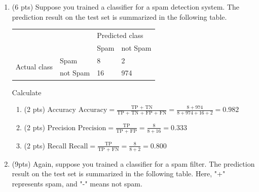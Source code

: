 \documentclass[a4paper]{article}
\theoremstyle{definition}
\newenvironment{soln}{
    \leavevmode\color{blue}\ignorespaces
}{}
\begin{document}
\begin{enumerate}
\begin{enumerate}
	\medskip

\end{enumerate}

\pagebreak

\item (6 pts) Suppose you trained a classifier for a spam detection system. The prediction result on the test set is summarized in the following table.
\begin{center}
	\begin{tabular}{l l | l l}
		&          & \multicolumn{2}{l}{Predicted class} \\
		&          & Spam           & not Spam           \\
		\hline
		\multirow{2}{*}{Actual class} & Spam     & 8              & 2                  \\
		& not Spam & 16             & 974               
	\end{tabular}
\end{center}

Calculate
\begin{enumerate}
	\item (2 pts) Accuracy
	\begin{soln}  $\text{Accuracy} = \frac{\text{TP + TN}}{\text{TP + TN + FP + FN}} = \frac{8 + 974}{8 + 974 + 16 + 2} = 0.982$ \end{soln}
	
	\medskip

	\item (2 pts) Precision
	\begin{soln}  $\text{Precision} = \frac{\text{TP}}{\text{TP + FP}} = \frac{8}{8 + 16} = 0.333$ \end{soln}
	
	\medskip

	\item (2 pts) Recall
	\begin{soln}  $\text{Recall} = \frac{\text{TP}}{\text{TP + FN}} = \frac{8}{8 + 2} = 0.800$ \end{soln}

	\medskip

\end{enumerate}


\item (9pts) Again, suppose you trained a classifier for a spam filter. The prediction result on the test set is summarized in the following table. Here, "+" represents spam, and "-" means not spam.


\end{enumerate}
\end{document}
